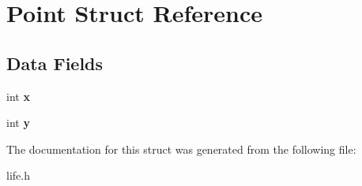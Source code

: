 \hypertarget{struct_point}{\section{Point Struct Reference}
\label{struct_point}
}
\subsection*{Data Fields}
\begin{DoxyCompactItemize}
\item 
\hypertarget{struct_point_a6150e0515f7202e2fb518f7206ed97dc}{int {\bfseries x}}\label{struct_point_a6150e0515f7202e2fb518f7206ed97dc}

\item 
\hypertarget{struct_point_a0a2f84ed7838f07779ae24c5a9086d33}{int {\bfseries y}}\label{struct_point_a0a2f84ed7838f07779ae24c5a9086d33}

\end{DoxyCompactItemize}


The documentation for this struct was generated from the following file\-:\begin{DoxyCompactItemize}
\item 
life.\-h\end{DoxyCompactItemize}
